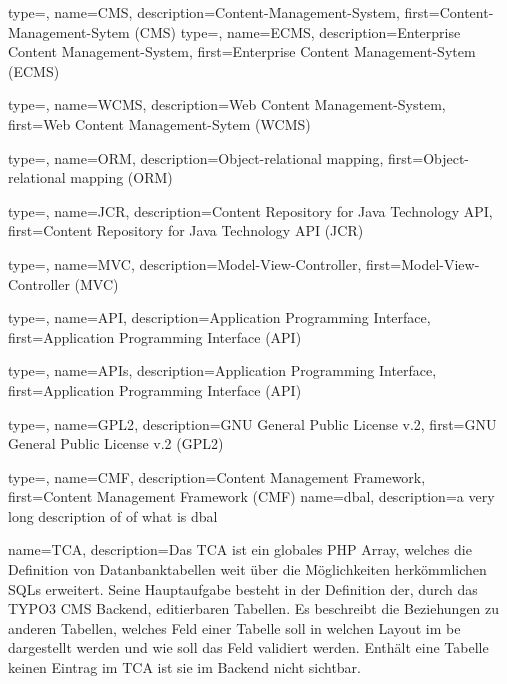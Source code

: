 {
	type=\acronymtype,
	name={CMS},
	description={Content-Management-System},
	first={Content-Management-Sytem (CMS)}
}
{
	type=\acronymtype,
	name={ECMS},
	description={Enterprise Content Management-System},
	first={Enterprise Content Management-Sytem (ECMS)}
}

{
	type=\acronymtype,
	name={WCMS},
	description={Web Content Management-System},
	first={Web Content Management-Sytem (WCMS)}
}

{
	type=\acronymtype,
	name={ORM},
	description={Object-relational mapping},
	first={Object-relational mapping (ORM)}
}

{
	type=\acronymtype,
	name={JCR},
	description={Content Repository for Java Technology API},
	first={Content Repository for Java Technology API (JCR)}
}

{
	type=\acronymtype,
	name={MVC},
	description={Model-View-Controller},
	first={Model-View-Controller (MVC)}
}

{
	type=\acronymtype,
	name={API},
	description={Application Programming Interface},
	first={Application Programming Interface (API)}
}

{
	type=\acronymtype,
	name={APIs},
	description={Application Programming Interface},
	first={Application Programming Interface (API)}
}

{
	type=\acronymtype,
	name={GPL2},
	description={GNU General Public License v.2},
	first={GNU General Public License v.2 (GPL2)}
}

{
	type=\acronymtype,
	name={CMF},
	description={Content Management Framework},
	first={Content Management Framework (CMF)}
}
{
	name={dbal},
	description={a very long description of of what is dbal}
}

{
	name={TCA},
	description={Das TCA ist ein globales PHP Array, welches die Definition von Datanbanktabellen weit über die Möglichkeiten herkömmlichen SQLs erweitert. Seine Hauptaufgabe besteht in der Definition der, durch das TYPO3 CMS Backend, editierbaren Tabellen. Es beschreibt die Beziehungen zu anderen Tabellen, welches Feld einer Tabelle soll in welchen Layout im \gls{be} dargestellt werden und wie soll das Feld validiert werden. Enthält eine Tabelle keinen Eintrag im TCA ist sie im Backend nicht sichtbar.}
}
